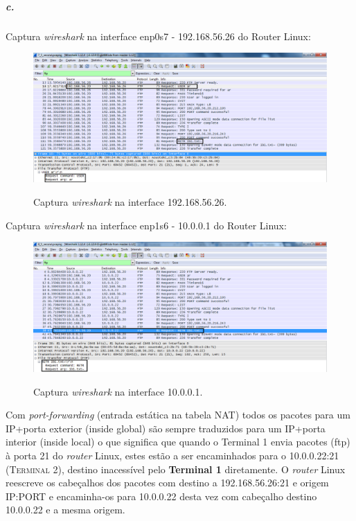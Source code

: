 \subparagraph{c.}
Captura \emph{wireshark} na interface \textsf{enp0s7 - 192.168.56.26} do \textsf{Router Linux}:

\begin{figure}[h]
\centering
\includegraphics[width=1\textwidth, height=0.3\textheight]{5_b-enp0s7.png}
\label{fig:enp0s7}
\caption{Captura \emph{wireshark} na interface \textsf{192.168.56.26}.}
\end{figure}

Captura \emph{wireshark} na interface \textsf{enp1s6 - 10.0.0.1} do \textsf{Router Linux}:


\begin{figure}[h]
\centering
\includegraphics[width=1\textwidth, height=0.3\textheight]{5_b-enp1s6.png}
\label{fig:enp1s6}
\caption{Captura \emph{wireshark} na interface \textsf{10.0.0.1}.}
\end{figure}

Com \emph{port-forwarding} (entrada estática na tabela NAT) todos os
pacotes para um IP+porta exterior (inside global) são sempre
traduzidos para um IP+porta interior (inside local) o que significa
que quando o \textsf{Terminal 1} envia pacotes (ftp) à porta 21 do 
\textsf{\emph{router} Linux}, estes estão a ser encaminhados para o \textsf{10.0.0.22:21} (\textsc{Terminal 2}), destino inacessível pelo 
\textbf{Terminal 1} diretamente. O \textsf{\emph{router} Linux} 
reescreve os cabeçalhos dos pacotes com destino a \textsf{192.168.56.26:21} 
e origem \textsf{IP:PORT} e encaminha-os para \textsf{10.0.0.22} 
desta vez com cabeçalho destino \textsf{10.0.0.22} e a mesma origem.


